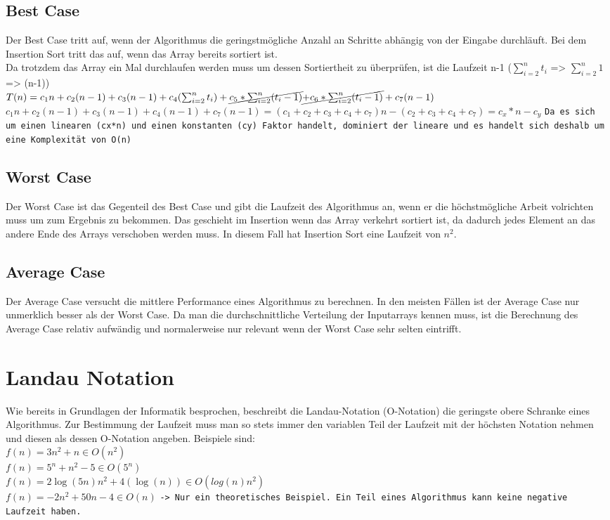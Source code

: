 \documentclass{article}
\begin{document}
	\subsection{Best Case}
	Der Best Case tritt auf, wenn der Algorithmus die geringstmögliche Anzahl an Schritte abhängig von der Eingabe durchläuft. Bei dem Insertion Sort tritt das auf, wenn das Array bereits sortiert ist. \\
	Da trotzdem das Array ein Mal durchlaufen werden muss um dessen Sortiertheit zu überprüfen, ist die Laufzeit n-1 ($\sum_{i=2}^{n}t_i$ => $\sum_{i=2}^{n}1$ => (n-1)) \\
	$T(n)=c_1n+c_2(n-1)+c_3(n-1)+c_4(\sum_{i=2}^{n}t_i)+\cancel{c_5*\sum_{i=2}^{n}(t_i-1)}\cancel{+c_6*\sum_{i=2}^{n}(t_i-1)}+c_7(n-1)$ \\
	$c_1n+c_2(n-1)+c_3(n-1)+c_4(n-1)+c_7(n-1)=(c_1+c_2+c_3+c_4+c_7)n-(c_2+c_3+c_4+c_7)=c_x*n-c_y$ \texttt{Da es sich um einen linearen (cx*n) und einen konstanten (cy) Faktor handelt, dominiert der lineare und es handelt sich deshalb um eine Komplexität von O(n)}
	\subsection{Worst Case}
	Der Worst Case ist das Gegenteil des Best Case und gibt die Laufzeit des Algorithmus an, wenn er die höchstmögliche Arbeit volrichten muss um zum Ergebnis zu bekommen. Das geschieht im Insertion wenn das Array verkehrt sortiert ist, da dadurch jedes Element an das andere Ende des Arrays verschoben werden muss. In diesem Fall hat Insertion Sort eine Laufzeit von $n^2$. \\
	\subsection{Average Case}
	Der Average Case versucht die mittlere Performance eines Algorithmus zu berechnen. In den meisten Fällen ist der Average Case nur unmerklich besser als der Worst Case. Da man die durchschnittliche Verteilung der Inputarrays kennen muss, ist die Berechnung des Average Case relativ aufwändig und normalerweise nur relevant wenn der Worst Case sehr selten eintrifft.
	\section{Landau Notation}
	Wie bereits in Grundlagen der Informatik besprochen, beschreibt die Landau-Notation (O-Notation) die geringste obere Schranke eines Algorithmus. Zur Bestimmung der Laufzeit muss man so stets immer den variablen Teil der Laufzeit mit der höchsten Notation nehmen und diesen als dessen O-Notation angeben. Beispiele sind: \\
	$f(n)=3n^2+n\in O(n^2)$ \\
	$f(n)=5^n+n^2-5\in O(5^n)$ \\
	$f(n)=2\log(5n)n^2+4(\log(n))\in O(log(n)n^2)$ \\
	$f(n)=-2n^2+50n-4\in O(n)$ \texttt{-> Nur ein theoretisches Beispiel. Ein Teil eines Algorithmus kann keine negative Laufzeit haben.} \\
\end{document}
